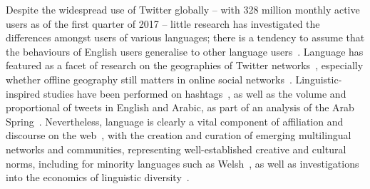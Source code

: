 \documentclass{llncs}
\begin{document}
%


Despite the widespread use of Twitter globally -- with 328 million
monthly active users as of the first quarter of 2017 -- little
research has investigated the differences amongst users of various
languages; there is a tendency to assume that the behaviours of
English users generalise to other language
users~\cite{hong-et-al:2011}. Language has featured as a facet of
research on the geographies of Twitter
networks~\cite{takhteyev-et-al:2012,magdy-et-al:2016}, especially
whether offline geography still matters in online social
networks~\cite{kulshrestha-et-al:2012}. Linguistic-inspired studies
have been performed on hashtags~\cite{cunha-et-al:2011}, as well as
the volume and proportional of tweets in English and Arabic, as part
of an analysis of the Arab
Spring~\cite{bruns-et-al:2013}. Nevertheless, language is clearly a
vital component of affiliation and discourse on the
web~\cite{zappavigna+martin:2012,zhuravleva-et-al:2015}, with the
creation and curation of emerging multilingual networks and
communities, representing well-established creative and cultural
norms, including for minority languages such as
Welsh~\cite{gj+uj:2013}, as well as investigations into the economics
of linguistic diversity~\cite{ginsburgh+weber:2011}.
\end{document}
